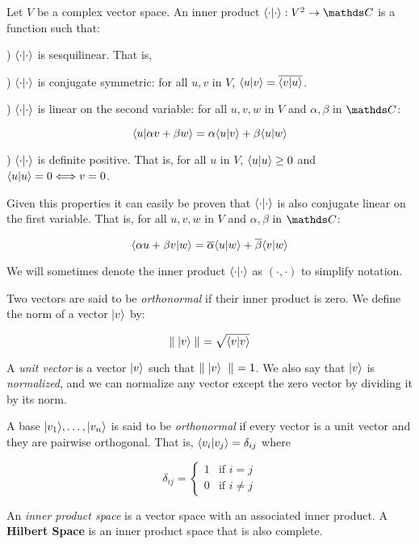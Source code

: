 \begin{definition}
	Let $V$ be a complex vector space. An inner product $\la \cdot | \cdot \ra: V^2 \rightarrow \C$ is a function such that:
	
	) $\langle \cdot | \cdot \rangle$ is sesquilinear. That is,
	
	) $\langle \cdot | \cdot \rangle$ is conjugate symmetric: for all $u,v$ in $V$, $\langle u | v \rangle = \overline{\langle v | u \rangle}$.
	
	) $\langle \cdot | \cdot \rangle$ is linear on the second variable: for all $u,v,w$ in $V$ and $\alpha, \beta$ in $\C$:
	
	$$ \langle u  | \alpha v + \beta w \rangle = \alpha \langle u | v \rangle + \beta \langle u | w \rangle $$
	
	) $\langle \cdot | \cdot \rangle$ is definite positive. That is, for all $u$ in $V$, $\langle u | u \rangle \geq 0$ and $\langle u | u \rangle = 0 \Longleftrightarrow v = 0$.
\end{definition}

Given this properties it can easily be proven that $\langle \cdot | \cdot \rangle$ is also conjugate linear on the first variable. That is, for all $u,v,w$ in $V$ and $\alpha, \beta$ in $\C$:

$$ \langle \alpha u + \beta v  | w \rangle = \overline{\alpha} \langle u | w \rangle + \overline{\beta} \langle v | w \rangle $$

We will sometimes denote the inner product $\langle \cdot | \cdot \rangle$ as $( \cdot , \cdot )$ to simplify notation.

Two vectors are said to be \emph{orthonormal} if their inner product is zero. We define the norm of a vector $|v\rangle$ by:

$$\parallel |v\rangle \parallel \ = \sqrt{ \langle v|v\rangle }$$

A \emph{unit vector} is a vector $|v\rangle$ such that $\parallel |v\rangle \  \parallel \ = 1 $. We also say that $|v\rangle$ is \emph{normalized}, and we can normalize any vector except the zero vector by dividing it by its norm.

A base $|v_1\rangle, \dotsc, |v_n\rangle$ is said to be \emph{orthonormal} if every vector is a unit vector and they are pairwise orthogonal. That is, $\langle v_i|v_j\rangle = \delta_{ij}$ where

\[
\delta_{ij} = 
\begin{cases}
	1 & \text{if } i = j  \\
	0 & \text{if } i \neq j
\end{cases}
\]

\begin{definition}
	An \emph{inner product space} is a vector space with an associated inner product. A \textbf{Hilbert Space} is an inner product space that is also complete.
\end{definition}

